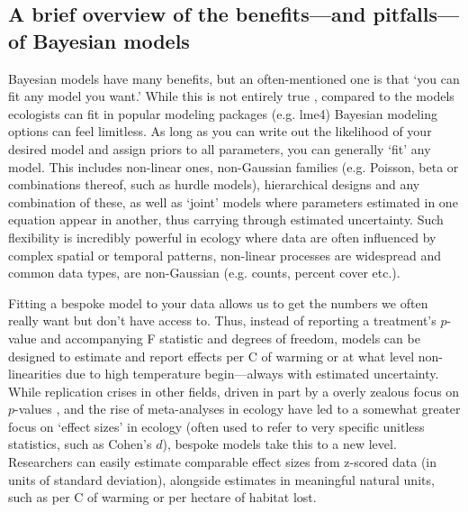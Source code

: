 \documentclass[11pt]{article}
\begin{document}
{\subsection{A brief overview of the benefits---and pitfalls---of Bayesian models} 

Bayesian models have many benefits, but an often-mentioned one is that `you can fit any model you want.' While this is not entirely true \citep{BDA,reid2019}, compared to the models ecologists can fit in popular modeling packages (e.g. \textsf{lme4}) Bayesian modeling options can feel limitless. As long as you can write out the likelihood of your desired model and assign priors to all parameters, you can generally `fit' any model. This includes non-linear ones, non-Gaussian families (e.g. Poisson, beta or combinations thereof, such as hurdle models), hierarchical designs and any combination of these, as well as `joint' models where parameters estimated in one equation appear in another, thus carrying through estimated uncertainty. Such flexibility is incredibly powerful in ecology where data are often influenced by complex spatial or temporal patterns, non-linear processes are widespread and common data types, are non-Gaussian (e.g. counts, percent cover etc.). 

Fitting a bespoke model to your data allows us to get the numbers we often really want but don't have access to. Thus, instead of reporting a treatment's $p$-value and accompanying F statistic and degrees of freedom, models can be designed to estimate and report effects per \degree C of warming or at what level non-linearities due to high temperature begin---always with estimated uncertainty. While replication crises in other fields, driven in part by a overly zealous focus on $p$-values \citep{halsey2015,loken2017}, and the rise of meta-analyses in ecology \citep{Hampton2013} have led to a somewhat greater focus on `effect sizes' in ecology (often used to refer to very specific unitless statistics, such as Cohen's $d$), bespoke models take this to a new level. Researchers can easily estimate comparable effect sizes from z-scored data (in units of standard deviation), alongside estimates in meaningful natural units, such as per \degree C of warming or per hectare of habitat lost.

}
\end{document}
